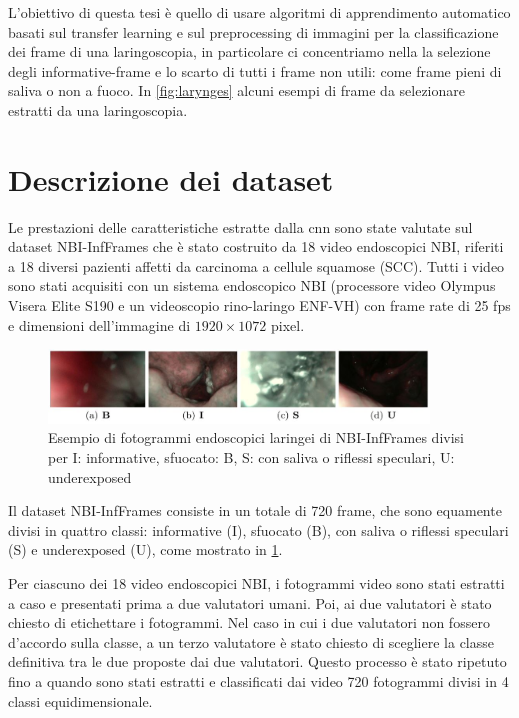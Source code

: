 L'obiettivo di questa tesi è quello di usare algoritmi di apprendimento automatico basati sul transfer learning e sul  preprocessing di immagini  per la classificazione dei frame di una laringoscopia, in particolare ci concentriamo nella la selezione degli informative-frame e lo scarto di tutti i frame non utili: come frame pieni di saliva o non a fuoco. In \cref{fig:larynges} alcuni esempi di frame da selezionare estratti da una laringoscopia.

\section{Descrizione dei dataset}\label{descrizione-dei-dataset}

Le prestazioni delle caratteristiche estratte dalla
\gls{cnn} sono state valutate sul dataset
NBI-InfFrames  che
è stato costruito da 18 video endoscopici NBI, riferiti a
18 diversi pazienti affetti da carcinoma a cellule squamose
(SCC). Tutti i video sono stati acquisiti con un sistema endoscopico
NBI (processore video Olympus Visera Elite S190 e
un videoscopio rino-laringo ENF-VH) con frame rate di
25 fps e dimensioni dell'immagine di \(1920\times 1072\) pixel.

\begin{figure}[ht]
    \centering
    \includegraphics[width=0.9\textwidth]{introduzione/Larynge.jpg}
    \caption[Esempio di fotogrammi endoscopici laringei di NBI-InfFrames]{Esempio di fotogrammi endoscopici laringei di NBI-InfFrames divisi per I: informative, sfuocato: B, S: con
    saliva o riflessi speculari,
    U: underexposed}
    \label{fig:larynges-2}
\end{figure}

Il dataset NBI-InfFrames consiste in un totale di 720 frame, che sono equamente divisi in quattro classi: informative (I), sfuocato (B), con saliva o riflessi speculari (S) e underexposed  (U), come mostrato in \cref{fig:larynges-2}. 

Per ciascuno dei 18 video endoscopici NBI, i fotogrammi video sono stati estratti a caso e
presentati prima a due valutatori umani. Poi, ai due valutatori è stato chiesto di etichettare i fotogrammi. Nel caso in cui i due
valutatori non fossero d'accordo sulla classe, a un terzo valutatore è stato
chiesto di scegliere la classe definitiva tra le due proposte
dai due valutatori. Questo processo è stato ripetuto fino a quando sono stati estratti e classificati dai video 720 fotogrammi divisi in 4 classi equidimensionale.


